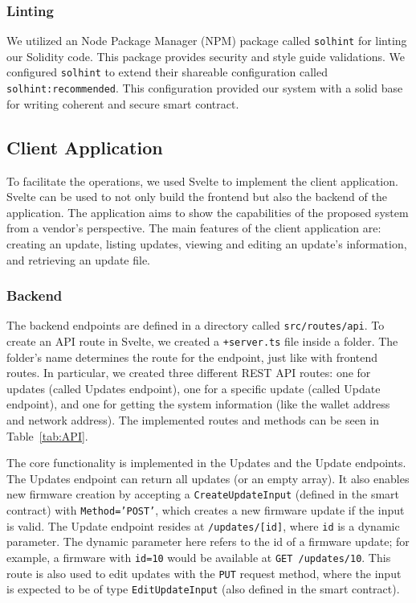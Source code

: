 \documentclass[conference]{IEEEtran}
\begin{document}
\subsubsection{Linting}

We utilized an Node Package Manager (NPM) package called \texttt{solhint} for linting our Solidity code. This package provides security and style guide validations. We configured \texttt{solhint} to extend their shareable configuration called \texttt{solhint:recommended}. This configuration provided our system with a solid base for writing coherent and secure smart contract. 


\subsection{Client Application}
To facilitate the operations, we used Svelte to implement the client application. Svelte can be used to not only build the frontend but also the backend of the application. The application aims to show the capabilities of the proposed system from a vendor's perspective. The main features of the client application are: creating an update, listing updates, viewing and editing an update's information, and retrieving an update file.

\subsubsection{Backend}

The backend endpoints are defined in a directory called \texttt{src/routes/api}. To create an API route in Svelte, we created a \texttt{+server.ts} file inside a folder. The folder's name determines the route for the endpoint, just like with frontend routes. In particular, we created three different REST API routes: one for updates (called Updates endpoint), one for a specific update (called Update endpoint), and one for getting the system information (like the wallet address and network address). The implemented routes and methods can be seen in Table~\ref{tab:API}.


The core functionality is implemented in the Updates and the Update endpoints. The Updates endpoint can return all updates (or an empty array). It also enables new firmware creation by accepting a \texttt{CreateUpdateInput} (defined in the smart contract) with \texttt{Method='POST'}, which creates a new firmware update if the input is valid. The Update endpoint resides at \texttt{/updates/[id]}, where \texttt{id} is a dynamic parameter. The dynamic parameter here refers to the id of a firmware update; for example, a firmware with \texttt{id=10} would be available at \texttt{GET /updates/10}. This route is also used to edit updates with the \texttt{PUT} request method, where the input is expected to be of type \texttt{EditUpdateInput} (also defined in the smart contract).
\end{document}
